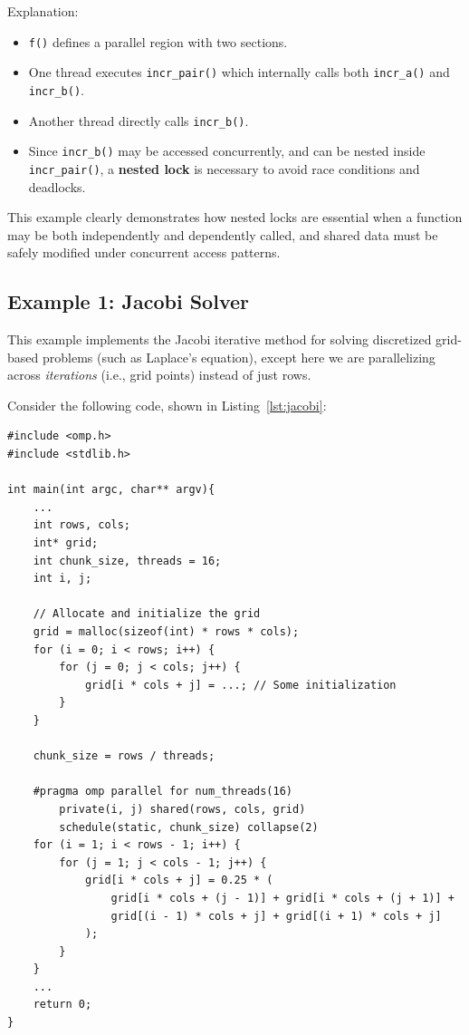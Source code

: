 \documentclass[12pt]{book}
\begin{document}
\noindent
Explanation:
\begin{itemize}
    \item \texttt{f()} defines a parallel region with two sections.
    \item One thread executes \texttt{incr\_pair()} which internally calls both \texttt{incr\_a()} and \texttt{incr\_b()}.
    \item Another thread directly calls \texttt{incr\_b()}.
    \item Since \texttt{incr\_b()} may be accessed concurrently, and can be nested inside \texttt{incr\_pair()}, a \textbf{nested lock} is necessary to avoid race conditions and deadlocks.
\end{itemize}

This example clearly demonstrates how nested locks are essential when a function may be both independently and dependently called, and shared data must be safely modified under concurrent access patterns.



\subsection{Example 1: Jacobi Solver}

This example implements the Jacobi iterative method for solving discretized grid-based problems (such as Laplace's equation), except here we are parallelizing across \emph{iterations} (i.e., grid points) instead of just rows.

Consider the following code, shown in Listing~\ref{lst:jacobi}:

\begin{lstlisting}[style=cppstyle, caption={Jacobi solver using OpenMP}, captionpos=b, label={lst:jacobi}]
#include <omp.h>
#include <stdlib.h>

int main(int argc, char** argv){
    ...
    int rows, cols;
    int* grid;
    int chunk_size, threads = 16;
    int i, j;

    // Allocate and initialize the grid
    grid = malloc(sizeof(int) * rows * cols);
    for (i = 0; i < rows; i++) {
        for (j = 0; j < cols; j++) {
            grid[i * cols + j] = ...; // Some initialization
        }
    }

    chunk_size = rows / threads;

    #pragma omp parallel for num_threads(16) 
        private(i, j) shared(rows, cols, grid) 
        schedule(static, chunk_size) collapse(2)
    for (i = 1; i < rows - 1; i++) {
        for (j = 1; j < cols - 1; j++) {
            grid[i * cols + j] = 0.25 * (
                grid[i * cols + (j - 1)] + grid[i * cols + (j + 1)] +
                grid[(i - 1) * cols + j] + grid[(i + 1) * cols + j]
            );
        }
    }
    ...
    return 0;
}
\end{lstlisting}
\end{document}

